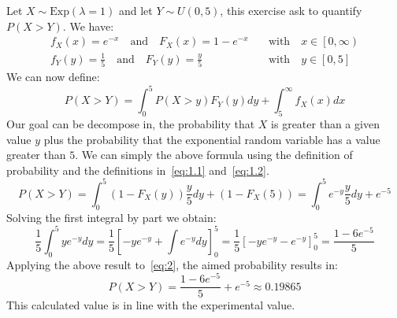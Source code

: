 \documentclass[10pt,a4paper]{article}
\begin{document}
Let \(X\sim\text{Exp}(\lambda = 1)\) and let \(Y\sim U(0,5)\), this exercise ask to quantify \(P(X>Y)\). We have:
\begin{align}
  \label{eq:1.1}
  f_{X}(x) = e^{-x} \quad\textrm{and}\quad F_{X}(x) = 1 - e^{-x} \quad&\textrm{with}\quad x\in\left[0,\infty\right)\\
  \label{eq:1.2}
  f_{Y}(y)=\frac{1}{5} \quad\textrm{and}\quad F_{Y}(y) = \frac{y}{5}\quad&\textrm{with}\quad y\in\left[0, 5\right]
\end{align}
We can now define:
\begin{equation*}
  P(X>Y) = \int^{5}_{0}{P(X>y)F_{Y}(y)dy} + \int^{\infty}_{5}{f_{X}(x)dx}
\end{equation*}
Our goal can be decompose in, the probability that \(X\) is greater than a given value \(y\) plus the probability that the exponential random variable has a value greater than \(5\). We can simply the above formula using the definition of probability and the definitions in~\ref{eq:1.1} and~\ref{eq:1.2}.
\begin{equation}
  \label{eq:2}
  P(X>Y) = \int^{5}_{0}{(1 - F_{X}(y))\frac{y}{5}}dy + (1 - F_{X}(5)) = \int^{5}_{0}{e^{-y}\frac{y}{5}}dy + e^{-5}
\end{equation}
Solving the first integral by part we obtain:
\begin{equation*}
  \frac{1}{5}\int^{5}_{0}{ye^{-y}}dy = \frac{1}{5}\left[-ye^{-y} + \int{e^{-y}}dy\right]_{0}^{5} = \frac{1}{5}\left[-ye^{-y} - e^{-y}\right]_{0}^{5} = \frac{1-6e^{-5}}{5}
\end{equation*}
Applying the above result to~\ref{eq:2}, the aimed probability results in:
\begin{equation*}
  P(X>Y) = \frac{1-6e^{-5}}{5} + e^{-5} \approx 0.19865 
\end{equation*}
This calculated value is in line with the experimental value.
\end{document}
